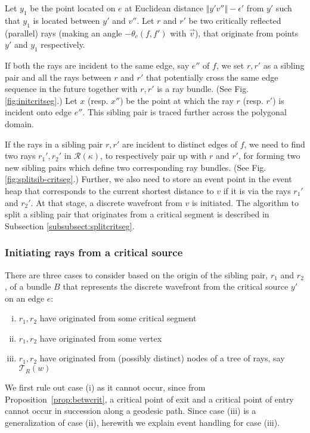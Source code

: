 \documentclass[11pt]{article}
\def\calT{\mathcal{T}}
\def\calR{\mathcal{R}}
\begin{document}
Let $y_1$ be the point located on $e$ at Euclidean distance $\Vert y'v'' \Vert - \epsilon'$  from $y'$ such that $y_1$ is located between $y'$ and $v''$.
Let $r$ and $r'$ be two critically reflected (parallel) rays (making an angle $-\theta_c(f, f')$ with $\overrightarrow{v}$), that originate from points $y'$ and $y_1$ respectively.

If both the rays are incident to the same edge, say $e''$ of $f$, we set $r, r'$ as a sibling pair and all the rays between $r$ and $r'$ that potentially cross the same edge sequence in the future together with $r, r'$ is a ray bundle. 
(See Fig. \ref{fig:initcritseg}.)
Let $x$ (resp. $x''$) be the point at which the ray $r$ (resp. $r'$) is incident onto edge $e''$. 
This sibling pair is traced further across the polygonal domain.

If the rays in a sibling pair $r, r'$ are incident to distinct edges of $f$, we need to find two rays $r_1', r_2'$ in $\calR(\kappa)$, to respectively pair up with $r$ and $r'$, for forming two new sibling pairs which define two corresponding ray bundles.
(See Fig. \ref{fig:splitsib-critseg}.)
Further, we also need to store an event point in the event heap that corresponds to the current shortest distance to $v$ if it is via the rays $r_1'$ and $r_2'$. 
At that stage, a discrete wavefront from $v$ is initiated. 
The algorithm to split a sibling pair that originates from a critical segment is described in Subsection \ref{subsubsect:splitcritseg}.

\subsubsection{Initiating rays from a critical source}
\label{subsect:initrayscritsrc}

There are three cases to consider based on the origin of the sibling pair, $r_1$ and $r_2$, of a bundle $B$ that represents  the discrete wavefront from the critical source $y'$ on an edge $e$:

\begin{enumerate}[(i)]
\item $r_1, r_2$ have originated from some critical segment
\item $r_1, r_2$ have originated from some vertex
\item $r_1, r_2$ have originated from (possibly distinct) nodes of a tree of rays, say $\calT_{R}(w)$
\end{enumerate}

We first rule out case (i) as it  cannot occur, since from  Proposition~\ref{prop:betwcrit}, 
a critical point of exit and a critical point of entry cannot occur in succession along a geodesic path.
Since case (iii) is a generalization of case (ii), herewith we explain event handling for case (iii).
\end{document}
